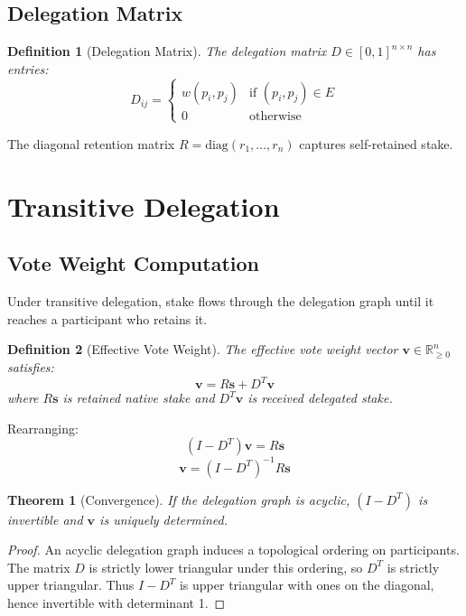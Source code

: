 \documentclass[11pt,a4paper]{article}
\newtheorem{definition}{Definition}
\newtheorem{theorem}{Theorem}
\begin{document}
\subsection{Delegation Matrix}

\begin{definition}[Delegation Matrix]
The delegation matrix $D \in [0,1]^{n \times n}$ has entries:
\[
D_{ij} =
\begin{cases}
w(p_i, p_j) & \text{if } (p_i, p_j) \in E \\
0 & \text{otherwise}
\end{cases}
\]
\end{definition}

The diagonal retention matrix $R = \text{diag}(r_1, \ldots, r_n)$ captures self-retained stake.

\section{Transitive Delegation}

\subsection{Vote Weight Computation}

Under transitive delegation, stake flows through the delegation graph until it reaches a participant who retains it.

\begin{definition}[Effective Vote Weight]
The effective vote weight vector $\mathbf{v} \in \mathbb{R}^n_{\geq 0}$ satisfies:
\[
\mathbf{v} = R\mathbf{s} + D^T \mathbf{v}
\]
where $R\mathbf{s}$ is retained native stake and $D^T\mathbf{v}$ is received delegated stake.
\end{definition}

Rearranging:
\[
(I - D^T)\mathbf{v} = R\mathbf{s}
\]
\[
\mathbf{v} = (I - D^T)^{-1} R\mathbf{s}
\]

\begin{theorem}[Convergence]
If the delegation graph is acyclic, $(I - D^T)$ is invertible and $\mathbf{v}$ is uniquely determined.
\end{theorem}

\begin{proof}
An acyclic delegation graph induces a topological ordering on participants. The matrix $D$ is strictly lower triangular under this ordering, so $D^T$ is strictly upper triangular. Thus $I - D^T$ is upper triangular with ones on the diagonal, hence invertible with determinant 1.
\end{proof}
\end{document}
